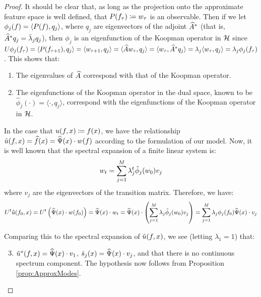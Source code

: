 \begin{proof}
	It should be clear that, as long as the projection onto the approximate feature space is well defined, that $P(f_{\tau}) \coloneqq w_{\tau} $ is an observable. Then if we let $\phi_j(f) = \langle P(f), q_j \rangle$, where $q_j$ are eigenvectors of the adjoint $\widehat{A}^{\ast}$ (that is, $\widehat{A}^{\ast} q_j = \bar \lambda_j q_j$), then $\phi_j$ is an eigenfunction of the Koopman operator in $\mathcal{H}$ since $U \phi_j(f_{\tau}) = \langle P(f_{\tau+1}), q_j \rangle = \langle w_{\tau+1}, q_j \rangle = \langle \widehat{A} w_{\tau}, q_j \rangle =  \langle w_{\tau}, \widehat{A}^{\ast} q_j \rangle =  \lambda_j \langle w_{\tau}, q_j \rangle =  \lambda_j \phi_j(f_{\tau})$. This shows that:
	\begin{enumerate}
		\item The eigenvalues of $\widehat{A}$ correspond with that of the Koopman operator.
		\item The eigenfunctions of the Koopman operator in the dual space, known to be $\hat\phi_j(\cdot) = \langle \cdot, q_j \rangle$, correspond with the eigenfunctions of the Koopman operator in $\mathcal{H}$.
	\end{enumerate}
	In the case that $u(f,x) \coloneqq f(x)$, we have the relationship $\hat u(f,x) = \widehat{f}(x) = \widehat{\Psi}(x) \cdot w(f)$ according to the formulation of our model. Now, it is well known that the spectral expansion of a finite linear system is:
	$$ w_t = \sum_{j=1}^{M} \lambda_j^t \hat\phi_j(w_0) v_j$$
	where $v_j$ are the eigenvectors of the transition matrix. Therefore, we have:
	$$ U^t \hat u(f_0,x) = U^t \left( \widehat{\Psi}(x) \cdot w(f_0) \right) = \widehat{\Psi}(x) \cdot w_t = \widehat{\Psi}(x) \cdot \left( \sum_{j=1}^{M} \lambda_j \hat\phi_j(w_0)  v_j \right) = \sum_{j=1}^{M} \lambda_j \phi_j(f_0) \widehat{\Psi}(x) \cdot v_j$$
	
	Comparing this to the spectral expansion of $\hat u(f,x)$, we see (letting $\lambda_1=1$) that:
	\begin{enumerate}
		\setcounter{enumi}{2}
		\item $\hat u^{\ast}(f,x) = \widehat{\Psi}(x) \cdot v_1$, $\hat s_j(x) = \widehat{\Psi}(x) \cdot v_j$, and that there is no continuous spectrum component. The hypothesis now follows from Proposition \ref{prop:ApproxModes}.
	\end{enumerate}
	
\end{proof}
